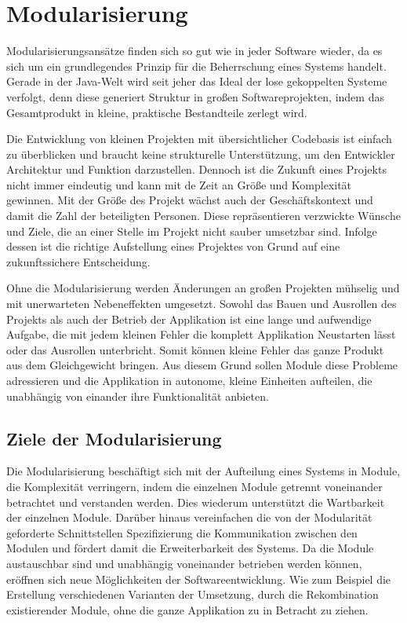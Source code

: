 \chapter{Modularisierung} \label{cha:modularisierung}

  Modularisierungsansätze finden sich so gut wie in jeder Software wieder, da es sich um ein grundlegendes Prinzip für die Beherrschung eines Systems handelt. Gerade in der Java-Welt wird seit jeher das Ideal der lose gekoppelten Systeme verfolgt, denn diese generiert Struktur in großen Softwareprojekten, indem das Gesamtprodukt in kleine, praktische Bestandteile zerlegt wird. \bigbreak
  
  Die Entwicklung von kleinen Projekten mit übersichtlicher Codebasis ist einfach zu überblicken und braucht keine strukturelle Unterstützung, um den Entwickler Architektur und Funktion darzustellen. Dennoch ist die Zukunft eines Projekts nicht immer eindeutig und kann mit de Zeit an Größe und Komplexität gewinnen. Mit der Größe des Projekt wächst auch der Geschäftskontext und damit die Zahl der beteiligten Personen. Diese repräsentieren verzwickte Wünsche und Ziele, die an einer Stelle im Projekt nicht sauber umsetzbar sind. Infolge dessen ist die richtige Aufstellung eines Projektes von Grund auf eine zukunftssichere Entscheidung.\bigbreak 

  Ohne die Modularisierung werden Änderungen an großen Projekten mühselig und mit unerwarteten Nebeneffekten umgesetzt. Sowohl das Bauen und Ausrollen des Projekts als auch der Betrieb der Applikation ist eine lange und aufwendige Aufgabe, die mit jedem kleinen Fehler die komplett Applikation Neustarten lässt oder das Ausrollen unterbricht. Somit können kleine Fehler das ganze Produkt aus dem Gleichgewicht bringen. Aus diesem Grund sollen Module diese Probleme adressieren und die Applikation in autonome, kleine Einheiten aufteilen, die unabhängig von einander ihre Funktionalität anbieten.

  \section{Ziele der Modularisierung} \label{sec:ZdM}
    Die Modularisierung beschäftigt sich mit der Aufteilung eines Systems in Module, die Komplexität verringern, indem die einzelnen Module getrennt voneinander betrachtet und verstanden werden. Dies wiederum unterstützt die Wartbarkeit der einzelnen Module. Darüber hinaus vereinfachen die von der Modularität geforderte Schnittstellen Spezifizierung die Kommunikation zwischen den Modulen und fördert damit die Erweiterbarkeit des Systems. Da die Module austauschbar sind und unabhängig voneinander betrieben werden können, eröffnen sich neue Möglichkeiten der Softwareentwicklung. Wie zum Beispiel die Erstellung verschiedenen Varianten der Umsetzung, durch die Rekombination existierender Module, ohne die ganze Applikation zu in Betracht zu ziehen.\cite{javaMod9,java9modRevealed,explorJava9}\bigbreak

